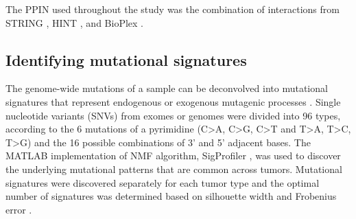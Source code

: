 \documentclass[english, 10pt, letterpaper]{article}
\begin{document}
The PPIN used throughout the study was the combination of interactions from STRING \cite{VonMering2005, Szklarczyk2019}, HINT \cite{Das2012}, and BioPlex \cite{Huttlin2015}.


\subsection*{Identifying mutational signatures}

The genome-wide mutations of a sample can be deconvolved into mutational signatures that represent endogenous or exogenous mutagenic processes \cite{Alexandrov2013}. 
Single nucleotide variants (SNVs) from exomes or genomes were divided into 96 types, according to the 6 mutations of a pyrimidine (C>A, C>G, C>T and T>A, T>C, T>G) and the 16 possible combinations of 3’ and 5’ adjacent bases.
The MATLAB \cite{MATLAB:2010} implementation of NMF algorithm, SigProfiler \cite{Alexandrov2013}, was used to discover the underlying mutational patterns that are common across tumors. 
Mutational signatures were discovered separately for each tumor type and the optimal number of signatures was determined based on silhouette width and Frobenius error \cite{Alexandrov2013DecipheringCancer.}.
\end{document}
